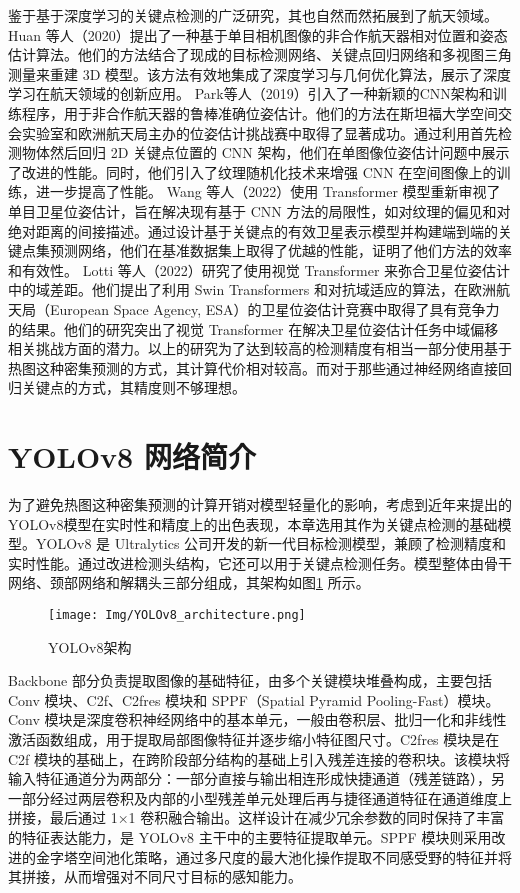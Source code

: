 鉴于基于深度学习的关键点检测的广泛研究，其也自然而然拓展到了航天领域。Huan 等人（2020）提出了一种基于单目相机图像的非合作航天器相对位置和姿态估计算法\citep{huan2020pose}。他们的方法结合了现成的目标检测网络、关键点回归网络和多视图三角测量来重建 3D 模型。该方法有效地集成了深度学习与几何优化算法，展示了深度学习在航天领域的创新应用。
Park等人（2019）引入了一种新颖的CNN架构和训练程序，用于非合作航天器的鲁棒准确位姿估计\citep{park2019towards}。他们的方法在斯坦福大学空间交会实验室和欧洲航天局主办的位姿估计挑战赛中取得了显著成功。通过利用首先检测物体然后回归 2D 关键点位置的 CNN 架构，他们在单图像位姿估计问题中展示了改进的性能。同时，他们引入了纹理随机化技术来增强 CNN 在空间图像上的训练，进一步提高了性能。
Wang 等人（2022）使用 Transformer 模型重新审视了单目卫星位姿估计，旨在解决现有基于 CNN 方法的局限性，如对纹理的偏见和对绝对距离的间接描述\citep{wang2022revisiting}。通过设计基于关键点的有效卫星表示模型并构建端到端的关键点集预测网络，他们在基准数据集上取得了优越的性能，证明了他们方法的效率和有效性。
Lotti 等人（2022）研究了使用视觉 Transformer 来弥合卫星位姿估计中的域差距。他们提出了利用 Swin Transformers 和对抗域适应的算法，在欧洲航天局（European Space Agency, ESA）的卫星位姿估计竞赛中取得了具有竞争力的结果\citep{lotti2022investigating}。他们的研究突出了视觉 Transformer 在解决卫星位姿估计任务中域偏移相关挑战方面的潜力。以上的研究为了达到较高的检测精度有相当一部分使用基于热图这种密集预测的方式，其计算代价相对较高。而对于那些通过神经网络直接回归关键点的方式，其精度则不够理想。



\section{YOLOv8 网络简介}
为了避免热图这种密集预测的计算开销对模型轻量化的影响，考虑到近年来提出的YOLOv8模型在实时性和精度上的出色表现，本章选用其作为关键点检测的基础模型。YOLOv8 是 Ultralytics 公司开发的新一代目标检测模型\cite{yolov8_ultralytics}，兼顾了检测精度和实时性能。通过改进检测头结构，它还可以用于关键点检测任务。模型整体由骨干网络、颈部网络和解耦头三部分组成，其架构如图\ref{fig:YOLOv8_architecture} 所示。
\begin{figure}[htbp]
	\centering
	\texttt{[image: Img/YOLOv8\_architecture.png]}
	\caption{YOLOv8架构}
	\label{fig:YOLOv8_architecture}
\end{figure}
Backbone 部分负责提取图像的基础特征，由多个关键模块堆叠构成，主要包括 Conv 模块、C2f、C2fres 模块和 SPPF（Spatial Pyramid Pooling-Fast）模块。Conv 模块是深度卷积神经网络中的基本单元，一般由卷积层、批归一化和非线性激活函数组成，用于提取局部图像特征并逐步缩小特征图尺寸。C2fres 模块是在 C2f 模块的基础上，在跨阶段部分结构的基础上引入残差连接的卷积块。该模块将输入特征通道分为两部分：一部分直接与输出相连形成快捷通道（残差链路），另一部分经过两层卷积及内部的小型残差单元处理后再与捷径通道特征在通道维度上拼接，最后通过 1×1 卷积融合输出。这样设计在减少冗余参数的同时保持了丰富的特征表达能力，是 YOLOv8 主干中的主要特征提取单元。SPPF 模块则采用改进的金字塔空间池化策略，通过多尺度的最大池化操作提取不同感受野的特征并将其拼接，从而增强对不同尺寸目标的感知能力。 

